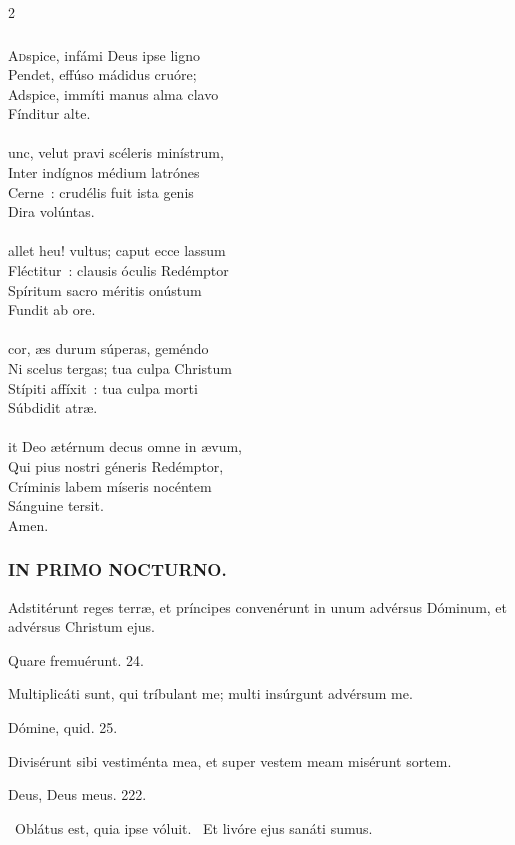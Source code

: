 \documentclass[9pt,twoside]{extarticle}
\begin{document}
\begin{multicols}{2}
{\subsubsection*{\center{}}
\lettrine{A}dspice, infámi Deus ipse ligno\\
Pendet, effúso mádidus cruóre;\\
Adspice, immíti manus alma clavo\\
Fínditur alte.\\
\\
unc, velut pravi scéleris minístrum,\\
Inter indígnos médium latrónes\\
Cerne~: crudélis fuit ista genis\\
Dira volúntas.\\
\\
allet heu! vultus; caput ecce lassum\\
Fléctitur~: clausis óculis Redémptor\\
Spíritum sacro méritis onústum\\
Fundit ab ore.\\
\\
 cor, æs durum súperas, geméndo\\
Ni scelus tergas; tua culpa Christum\\
Stípiti affíxit~: tua culpa morti\\
Súbdidit atræ.\\
\\
it Deo ætérnum decus omne in ævum,\\
Qui pius nostri géneris Redémptor,\\
Críminis labem míseris nocéntem\\
Sánguine tersit.\\
Amen.

\subsubsection*{\center \textsc{IN PRIMO NOCTURNO.}}
\begin{tightlist}{}
\item {} Adstitérunt reges terræ, et príncipes convenérunt in unum advérsus Dóminum, et advérsus Christum ejus.
\item {} Quare fremuérunt. 24.
\item {} Multiplicáti sunt, qui tríbulant me; multi insúrgunt advérsum me.
\item {} Dómine, quid. 25.
\item {} Divisérunt sibi vestiménta mea, et super vestem meam misérunt sortem.
\item {} Deus, Deus meus. 222.
\item {}~Oblátus est, quia ipse vóluit. ~Et livóre ejus sanáti sumus.
\item {}
\end{tightlist}

}
\end{multicols}
\end{document}
